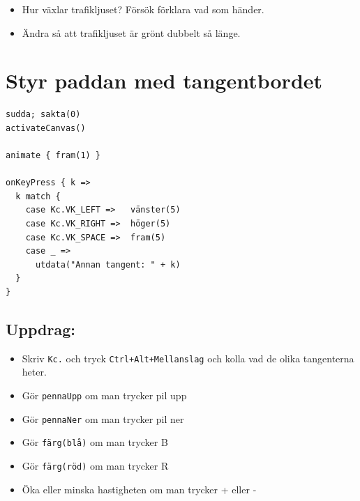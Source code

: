 \begin{itemize}

\item {Hur växlar trafikljuset? Försök förklara vad som händer.}
\item {Ändra så att trafikljuset är grönt dubbelt så länge.}

\end{itemize}


\chapter{Styr paddan med tangentbordet}
\begin{multicols}{2}

\begin{lstlisting}[basicstyle={\ttfamily\fontsize{18}{22}\selectfont},numbers=none]
sudda; sakta(0)
activateCanvas()

animate { fram(1) }

onKeyPress { k =>
  k match {
    case Kc.VK_LEFT =>   vänster(5)
    case Kc.VK_RIGHT =>  höger(5)
    case Kc.VK_SPACE =>  fram(5)
    case _ => 
      utdata("Annan tangent: " + k)
  }
}
\end{lstlisting}
        


\columnbreak


\section*{\color{BrickRed}Uppdrag:}


\begin{itemize}

\item {Skriv \lstinline{Kc.} och tryck \lstinline{Ctrl+Alt+Mellanslag} och kolla vad de olika tangenterna heter.}
\item {Gör \lstinline{pennaUpp} om man trycker pil upp}
\item {Gör \lstinline{pennaNer} om man trycker pil ner}
\item {Gör \lstinline{färg(blå)} om man trycker B}
\item {Gör \lstinline{färg(röd)} om man trycker R}
\item {Öka eller minska hastigheten om man trycker + eller -}

\end{itemize}


\end{multicols}

